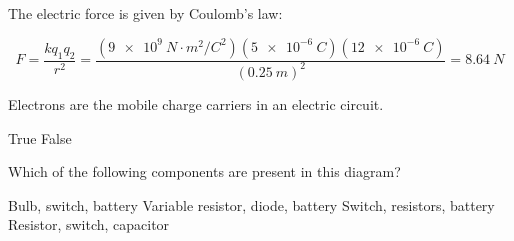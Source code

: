 \documentclass[]{exam}
\begin{document}
\begin{questions}
\begin{solution}
The electric force is given by Coulomb's law:

\begin{equation*}
    F = \frac{kq_1q_2}{r^2} = \frac{\left(\SI{9e9}{N\cdot m^2/C^2}\right)(\SI{5e-6}{C})(\SI{12e-6}{C})}{(\SI{0.25}{m})^2} = \boxed{\SI{8.64}{N}}
\end{equation*}
\end{solution}




\question
Electrons are the mobile charge carriers in an electric circuit.

\begin{randomizechoices}[norandomize]
    \correctchoice True
    \choice False
\end{randomizechoices}

\question
Which of the following components are present in this diagram?

\begin{center}
\end{center}

\begin{randomizechoices}
    \choice Bulb, switch, battery
    \choice Variable resistor, diode, battery
    \correctchoice Switch, resistors, battery
    \choice Resistor, switch, capacitor
\end{randomizechoices}





\end{questions}
\end{document}
